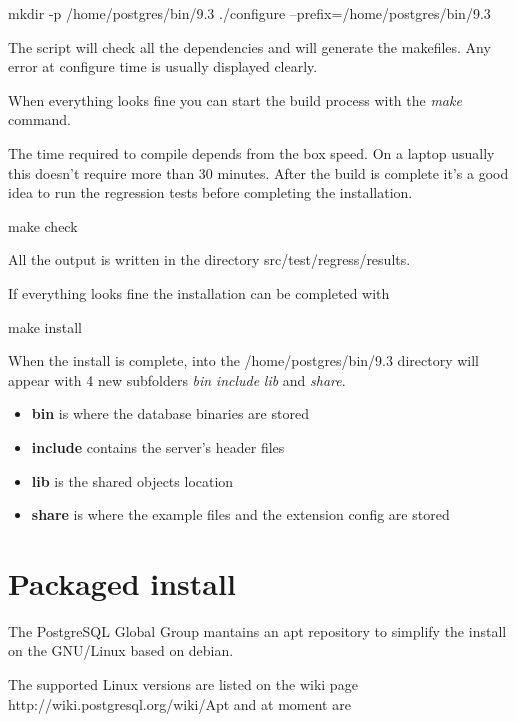 \begin{smallverbatim}
mkdir -p /home/postgres/bin/9.3
./configure --prefix=/home/postgres/bin/9.3
\end{smallverbatim}
The script will check all the dependencies and will generate the makefiles. 
Any error at configure time is usually displayed clearly.

When everything looks fine you can start the build process with the \textit{make} command.

The time required to compile depends from the box speed. On a laptop usually this doesn't require 
more than 30 minutes. After the build is complete it's a good idea to run the regression tests 
before completing the installation.

\begin{smallverbatim}
make check 
\end{smallverbatim}
 

All the output is written in the directory src/test/regress/results. 

If everything looks fine the installation can be completed with

\begin{smallverbatim}
make install
\end{smallverbatim}


When the install is complete, into the /home/postgres/bin/9.3 directory will appear with 4 new
subfolders \textit{bin} \textit{include} \textit{lib} and \textit{share}.

\begin{itemize}
 \item \textbf{bin} is where the database binaries are stored
 \item \textbf{include} contains the server's header files
 \item \textbf{lib} is the shared objects location
 \item \textbf{share} is where the example files and the extension config are stored
\end{itemize}



\section{Packaged install}
\label{sec:DEBIAN_INSTALL}

The PostgreSQL Global Group mantains an apt repository to simplify the install on the GNU/Linux based on debian.

The supported Linux versions are listed on the wiki page http://wiki.postgresql.org/wiki/Apt and at moment are

